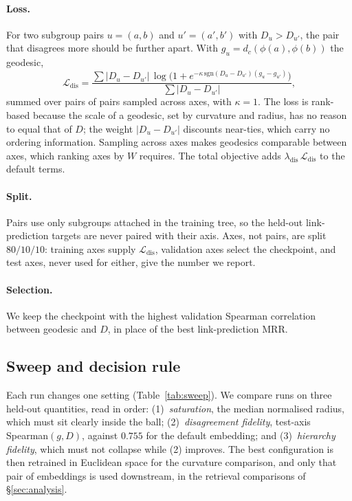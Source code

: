\documentclass[11pt]{article}
\begin{document}
\paragraph{Loss.} For two subgroup pairs $u = (a, b)$ and $u' = (a', b')$
with $D_u > D_{u'}$, the pair that disagrees more should be further apart.
With $g_u = d_c(\phi(a), \phi(b))$ the geodesic,
\begin{equation}
  \mathcal{L}_{\mathrm{dis}} =
  \frac{\sum |D_u - D_{u'}|\,
        \log\!\bigl(1 + e^{-\kappa\,\mathrm{sgn}(D_u - D_{u'})(g_u - g_{u'})}\bigr)}
       {\sum |D_u - D_{u'}|},
\end{equation}
summed over pairs of pairs sampled across axes, with $\kappa = 1$. The loss is
rank-based because the scale of a geodesic, set by curvature and radius, has
no reason to equal that of $D$; the weight $|D_u - D_{u'}|$ discounts
near-ties, which carry no ordering information. Sampling across axes makes
geodesics comparable between axes, which ranking axes by $W$ requires. The
total objective adds $\lambda_{\mathrm{dis}}\,\mathcal{L}_{\mathrm{dis}}$ to
the default terms.

\paragraph{Split.} Pairs use only subgroups attached in the training tree, so
the held-out link-prediction targets are never paired with their axis. Axes,
not pairs, are split $80/10/10$: training axes supply
$\mathcal{L}_{\mathrm{dis}}$, validation axes select the checkpoint, and test
axes, never used for either, give the number we report.

\paragraph{Selection.} We keep the checkpoint with the highest validation
Spearman correlation between geodesic and $D$, in place of the best
link-prediction MRR.

\subsection{Sweep and decision rule}
Each run changes one setting (Table~\ref{tab:sweep}). We compare runs on three
held-out quantities, read in order: (1)~\emph{saturation}, the median
normalised radius, which must sit clearly inside the ball; (2)~\emph{disagreement
fidelity}, test-axis Spearman$(g, D)$, against $0.755$ for the default
embedding; and (3)~\emph{hierarchy fidelity}, which must not collapse while (2)
improves. The best configuration is then retrained in Euclidean space for the
curvature comparison, and only that pair of embeddings is used downstream, in
the retrieval comparisons of \S\ref{sec:analysis}.
\end{document}

